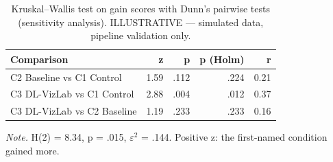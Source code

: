\begin{table}[htbp]
\centering
\small
\caption{Kruskal–Wallis test on gain scores with Dunn's pairwise tests (sensitivity analysis). ILLUSTRATIVE — simulated data, pipeline validation only.}
\label{tab:T07}
\begin{tabular}{lrrrr}
\toprule
Comparison & z & p & p (Holm) & r \\
\midrule
C2 Baseline vs C1 Control & 1.59 & .112 & .224 & 0.21 \\
C3 DL-VizLab vs C1 Control & 2.88 & .004 & .012 & 0.37 \\
C3 DL-VizLab vs C2 Baseline & 1.19 & .233 & .233 & 0.16 \\
\bottomrule
\end{tabular}
\par\smallskip\footnotesize\textit{Note.} H(2) = 8.34, p = .015, $\varepsilon^2$ = .144. Positive z: the first-named condition gained more.
\end{table}
